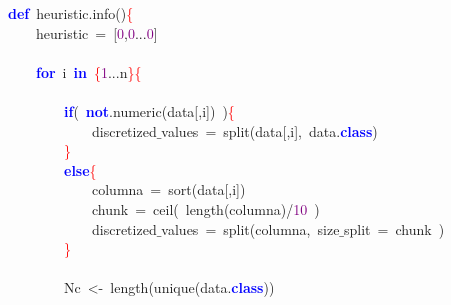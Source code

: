 \noindent
\mbox{}\textbf{\textcolor{Blue}{def}}\ heuristic\textcolor{BrickRed}{.}info\textcolor{BrickRed}{()}\textcolor{Red}{\{} \\
\mbox{}\ \ \ \ heuristic\ \textcolor{BrickRed}{=}\ \textcolor{BrickRed}{[}\textcolor{Purple}{0}\textcolor{BrickRed}{,}\textcolor{Purple}{0}\textcolor{BrickRed}{...}\textcolor{Purple}{0}\textcolor{BrickRed}{]} \\
\mbox{} \\
\mbox{}\ \ \ \ \textbf{\textcolor{Blue}{for}}\ i\ \textbf{\textcolor{Blue}{in}}\ \textcolor{Red}{\{}\textcolor{Purple}{1}\textcolor{BrickRed}{...}n\textcolor{Red}{\}\{} \\
\mbox{} \\
\mbox{}\ \ \ \ \ \ \ \ \textbf{\textcolor{Blue}{if}}\textcolor{BrickRed}{(}\ \textbf{\textcolor{Blue}{not}}\textcolor{BrickRed}{.}numeric\textcolor{BrickRed}{(}data\textcolor{BrickRed}{[,}i\textcolor{BrickRed}{])}\ \textcolor{BrickRed}{)}\textcolor{Red}{\{} \\
\mbox{}\ \ \ \ \ \ \ \ \ \ \ \ discretized$\_$values\ \textcolor{BrickRed}{=}\ split\textcolor{BrickRed}{(}data\textcolor{BrickRed}{[,}i\textcolor{BrickRed}{],}\ data\textcolor{BrickRed}{.}\textbf{\textcolor{Blue}{class}}\textcolor{BrickRed}{)} \\
\mbox{}\ \ \ \ \ \ \ \ \textcolor{Red}{\}} \\
\mbox{}\ \ \ \ \ \ \ \ \textbf{\textcolor{Blue}{else}}\textcolor{Red}{\{} \\
\mbox{}\ \ \ \ \ \ \ \ \ \ \ \ columna\ \textcolor{BrickRed}{=}\ sort\textcolor{BrickRed}{(}data\textcolor{BrickRed}{[,}i\textcolor{BrickRed}{])} \\
\mbox{}\ \ \ \ \ \ \ \ \ \ \ \ chunk\ \textcolor{BrickRed}{=}\ ceil\textcolor{BrickRed}{(}\ length\textcolor{BrickRed}{(}columna\textcolor{BrickRed}{)/}\textcolor{Purple}{10}\ \textcolor{BrickRed}{)} \\
\mbox{}\ \ \ \ \ \ \ \ \ \ \ \ discretized$\_$values\ \textcolor{BrickRed}{=}\ split\textcolor{BrickRed}{(}columna\textcolor{BrickRed}{,}\ size$\_$split\ \textcolor{BrickRed}{=}\ chunk\ \textcolor{BrickRed}{)} \\
\mbox{}\ \ \ \ \ \ \ \ \textcolor{Red}{\}} \\
\mbox{} \\
\mbox{}\ \ \ \ \ \ \ \ Nc\ \textcolor{BrickRed}{\textless{}-}\ length\textcolor{BrickRed}{(}unique\textcolor{BrickRed}{(}data\textcolor{BrickRed}{.}\textbf{\textcolor{Blue}{class}}\textcolor{BrickRed}{))} \\
